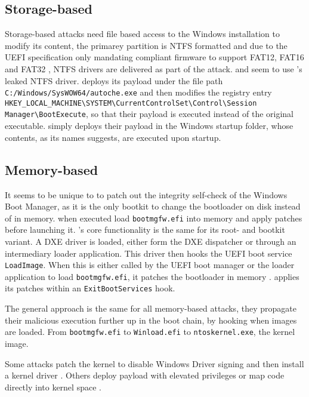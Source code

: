\subsection{Storage-based}

Storage-based attacks need file based access to the Windows installation to modify its content, the primarey partition is \ac{NTFS} formatted and due to the \ac{UEFI} specification only mandating compliant firmware to support \ac{FAT}12, \ac{FAT}16 and \ac{FAT}32 \cite[13.3.1.1]{uefi-spec}, \ac{NTFS} drivers are delivered as part of the attack. \cite{mosaicregressor} and \cite{lojax} seem to use \cite{vector-edk}'s leaked \ac{NTFS} driver. \cite{lojax} deploys its payload under the file path \lstinline{C:/Windows/SysWOW64/autoche.exe} and then modifies the registry entry \lstinline{HKEY_LOCAL_MACHINE\SYSTEM\CurrentControlSet\Control\Session Manager\BootExecute}, so that their payload is executed instead of the original executable. \cite{mosaicregressor} simply deploys their payload in the Windows startup folder, whose contents, as its names suggests, are executed upon startup.

\subsection{Memory-based}

It seems to be unique to \cite{especter} to patch out the integrity self-check of the Windows Boot Manager, as it is the only bootkit to change the bootloader on disk instead of in memory.
\cite{finspy, dreamboot} when executed load \lstinline{bootmgfw.efi} into memory and apply patches before launching it.
\cite{efiguard}'s core functionality is the same for its root- and bootkit variant.
A \ac{DXE} driver is loaded, either form the \ac{DXE} dispatcher or through an intermediary loader application.
This driver then hooks the \ac{UEFI} boot service \lstinline{LoadImage}. When this is either called by the \ac{UEFI} boot manager or the loader application to load \lstinline{bootmgfw.efi}, it patches the bootloader in memory \cite{efiguard}. \cite{moonbounce} applies its patches within an \lstinline{ExitBootServices} hook.

The general approach is the same for all memory-based attacks, they propagate their malicious execution further up in the boot chain, by hooking when images are loaded. From \lstinline{bootmgfw.efi} to \lstinline{Winload.efi} to \lstinline{ntoskernel.exe}, the kernel image.

Some attacks patch the kernel to disable Windows Driver signing and then install a kernel driver \cite{efiguard,especter}.
Others deploy payload with elevated privileges \cite{finspy, dreamboot} or map code directly into kernel space \cite{moonbounce,cosmicstrand}.


